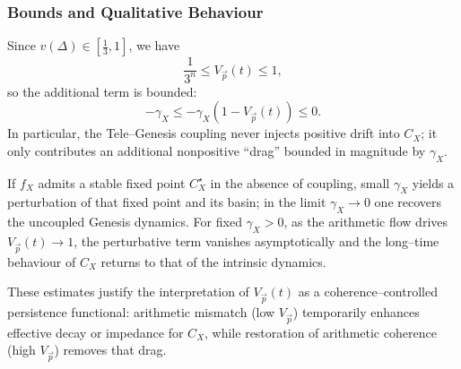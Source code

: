 \documentclass[11pt]{article}
\begin{document}
\subsubsection{Bounds and Qualitative Behaviour}

Since $v(\Delta)\in[\tfrac13,1]$, we have
\[
  \frac{1}{3^n}
  \le V_{\vec p}(t) \le 1,
\]
so the additional term is bounded:
\[
  -\gamma_X \le -\gamma_X(1-V_{\vec p}(t)) \le 0.
\]
In particular, the Tele–Genesis coupling never injects positive drift into $C_X$; it only contributes an additional nonpositive ``drag'' bounded in magnitude by $\gamma_X$.

If $f_X$ admits a stable fixed point $C_X^\star$ in the absence of coupling, small $\gamma_X$ yields a perturbation of that fixed point and its basin; in the limit $\gamma_X\to 0$ one recovers the uncoupled Genesis dynamics. For fixed $\gamma_X>0$, as the arithmetic flow drives $V_{\vec p}(t)\to 1$, the perturbative term vanishes asymptotically and the long–time behaviour of $C_X$ returns to that of the intrinsic dynamics.

These estimates justify the interpretation of $V_{\vec p}(t)$ as a coherence–controlled persistence functional: arithmetic mismatch (low $V_{\vec p}$) temporarily enhances effective decay or impedance for $C_X$, while restoration of arithmetic coherence (high $V_{\vec p}$) removes that drag.

\nocite{*}


\end{document}
